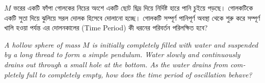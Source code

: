 \documentclass[12pt, a4paper]{article}
\begin{document}
\begin{tcolorbox}[questionbox={প্রশ্ন (Question) 4}]
\noindent
$M$ ভরের একটি ফাঁপা গোলকের নিচের অংশে একটি ছোট ছিদ্র দিয়ে নির্দিষ্ট হারে পানি চুইয়ে পড়ছে। গোলকটিকে একটি সুতা দিয়ে ঝুলিয়ে সরল দোলক হিসেবে দোলানো হচ্ছে। গোলকটি সম্পূর্ণ পানিপূর্ণ অবস্থা থেকে শুরু করে সম্পূর্ণ খালি হওয়া পর্যন্ত এর দোলনকালের (Time Period) কী ধরনের পরিবর্তন পরিলক্ষিত হবে?

\vspace{0.8em}
\begin{english}
\noindent\textit{\color{darkgray}
A hollow sphere of mass $M$ is initially completely filled with water and suspended by a long thread to form a simple pendulum. Water slowly and continuously drains out through a small hole at the bottom. As the water drains from completely full to completely empty, how does the time period of oscillation behave?
}
\end{english}
\end{tcolorbox}
\end{document}
